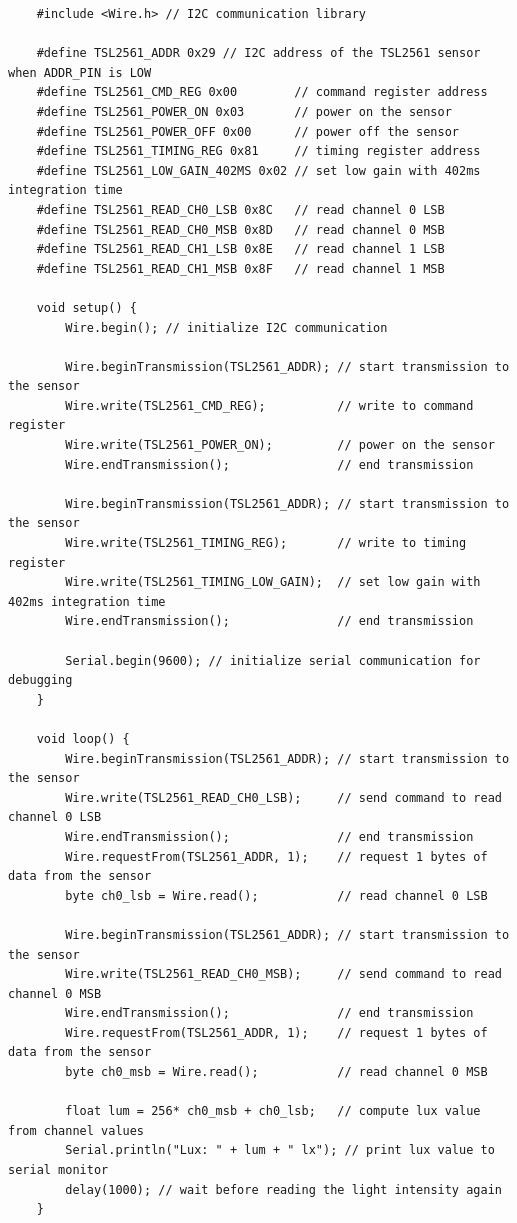 \begin{lstlisting}
	#include <Wire.h> // I2C communication library

	#define TSL2561_ADDR 0x29 // I2C address of the TSL2561 sensor when ADDR_PIN is LOW
	#define TSL2561_CMD_REG 0x00        // command register address
	#define TSL2561_POWER_ON 0x03       // power on the sensor
	#define TSL2561_POWER_OFF 0x00      // power off the sensor
	#define TSL2561_TIMING_REG 0x81     // timing register address
	#define TSL2561_LOW_GAIN_402MS 0x02 // set low gain with 402ms integration time
	#define TSL2561_READ_CH0_LSB 0x8C   // read channel 0 LSB
	#define TSL2561_READ_CH0_MSB 0x8D   // read channel 0 MSB
	#define TSL2561_READ_CH1_LSB 0x8E   // read channel 1 LSB
	#define TSL2561_READ_CH1_MSB 0x8F   // read channel 1 MSB

	void setup() {
		Wire.begin(); // initialize I2C communication

		Wire.beginTransmission(TSL2561_ADDR); // start transmission to the sensor
		Wire.write(TSL2561_CMD_REG);          // write to command register
		Wire.write(TSL2561_POWER_ON);         // power on the sensor
		Wire.endTransmission();               // end transmission

		Wire.beginTransmission(TSL2561_ADDR); // start transmission to the sensor
		Wire.write(TSL2561_TIMING_REG);       // write to timing register
		Wire.write(TSL2561_TIMING_LOW_GAIN);  // set low gain with 402ms integration time
		Wire.endTransmission();               // end transmission

		Serial.begin(9600); // initialize serial communication for debugging
	}

	void loop() {
		Wire.beginTransmission(TSL2561_ADDR); // start transmission to the sensor
		Wire.write(TSL2561_READ_CH0_LSB);     // send command to read channel 0 LSB
		Wire.endTransmission();               // end transmission
		Wire.requestFrom(TSL2561_ADDR, 1);    // request 1 bytes of data from the sensor
		byte ch0_lsb = Wire.read();           // read channel 0 LSB

		Wire.beginTransmission(TSL2561_ADDR); // start transmission to the sensor
		Wire.write(TSL2561_READ_CH0_MSB);     // send command to read channel 0 MSB
		Wire.endTransmission();               // end transmission
		Wire.requestFrom(TSL2561_ADDR, 1);    // request 1 bytes of data from the sensor
		byte ch0_msb = Wire.read();           // read channel 0 MSB
		
		float lum = 256* ch0_msb + ch0_lsb;   // compute lux value from channel values
		Serial.println("Lux: " + lum + " lx"); // print lux value to serial monitor
		delay(1000); // wait before reading the light intensity again
	}
\end{lstlisting}

